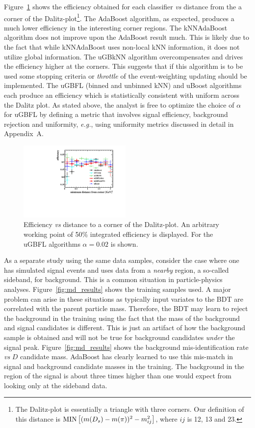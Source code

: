 Figure~\ref{fig:dalitz_results} shows the efficiency obtained for each classifier {\em vs} distance from the a corner of the Dalitz-plot\footnote{The Dalitz-plot is essentially a triangle with three corners. Our definition of this distance is ${\rm MIN}\left[(m(D_s)-m(\pi))^2 - m_{ij}^2\right]$, where $ij$ is 12, 13 and 23.}.  The AdaBoost algorithm, as expected, produces a much lower efficiency in the interesting corner regions.  The kNNAdaBoost algorithm does not improve upon the AdaBoost result much.  This is likely due to the fact that while kNNAdaBoost uses non-local kNN information, it does not utilize global information.  The uGBkNN algorithm overcompensates and drives the efficiency higher at the corners.  This suggests that if this algorithm is to be used some stopping criteria or {\em throttle} of the event-weighting updating should be implemented.  
The uGBFL (binned and unbinned kNN) and uBoost algorithms each produce an efficiency which is statistically consistent with uniform across the Dalitz plot.  
As stated above, the analyst is free to optimize the choice of $\alpha$ for uGBFL by defining a metric that involves signal efficiency, background rejection and uniformity, {\em e.g.}, using uniformity metrics discussed in detail in Appendix~A.  

\begin{figure}[] 
  \centering 
  \includegraphics[width=0.49\textwidth]{graphs2/DP_compare.pdf}
  \caption{\label{fig:dalitz_results} Efficiency {\em vs} distance to a corner of the Dalitz-plot.  An arbitrary working point of 50\% integrated efficiency is displayed. For the uGBFL algorithms $\alpha=0.02$ is shown.}
\end{figure}


As a separate study using the same data samples, consider the case where one has simulated signal events and uses data from a {\em nearby} region, a so-called sideband, for background.  This is a common situation in particle-physics analyses.  Figure~\ref{fig:md_results} shows the training samples used.  A major problem can arise in these situations as typically input variates to the BDT are correlated with the parent particle mass.  Therefore, the BDT may learn to reject the background in the training using the fact that the mass of the background and signal candidates is different.  This is just an artifact of how the background sample is obtained and will not be true for background candidates {\em under} the signal peak.  Figure~\ref{fig:md_results} shows the background mis-identification rate {\em vs} $D$ candidate mass.  AdaBoost has clearly learned to use this mis-match in signal and background candidate masses in the training.   The background in the region of the signal is about three times higher than one would expect from looking only at the sideband data.  


